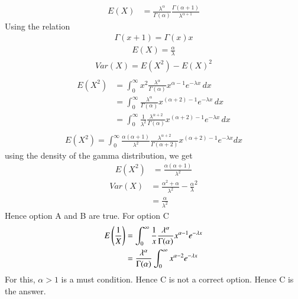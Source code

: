 \documentclass[journal,12pt,twocolumn]{IEEEtran}
\theoremstyle{remark}
\begin{document}
\begin{align}
E(X)&= \frac{\lambda^{\alpha}}{\Gamma(\alpha)}\frac{\Gamma(\alpha+1)}{\lambda^{\alpha+1}}
\end{align}
Using the relation
\begin{align}
\Gamma(x+1) = \Gamma(x) x
\end{align}
\begin{align}
E(X)=\frac{\alpha}{\lambda}
\end{align}
\begin{align}
{Var}(X) = {E}(X^2) - {E}(X)^2 \\
\end{align}
\begin{align}
{E}(X^2) &= \int_{0}^{\infty} x^2 \frac{{\lambda}^{\alpha}}{\Gamma({\alpha})} x^{{\alpha}-1} e^{-{\lambda}x} \, {d}x \\
&=\int_{0}^{\infty} \frac{{\lambda}^{\alpha}}{\Gamma({\alpha})} x^{({\alpha}+2)-1} e^{-{\lambda}x} \, {d}x \\
&=\int_{0}^{\infty} \frac{1}{{\lambda}^2} \frac{{\lambda}^{{\alpha}+2}}{\Gamma({\alpha})} x^{({\alpha}+2)-1} e^{-{\lambda}x} \, {d}x \\
\end{align}
\begin{align}
{E}(X^2) = \int_{0}^{\infty} \frac{{\alpha}({\alpha}+1)}{{\lambda}^2}  \frac{{\lambda}^{{\alpha}+2}}{\Gamma({\alpha}+2)} x^{({\alpha}+2)-1} e^{-{\lambda}x}{d}x
\end{align}
using the density of the gamma distribution, we get
\begin{align}
{E}(X^2) &= \frac{{\alpha}({\alpha}+1)}{{\lambda}^2} 
\end{align}
\begin{align}
{Var}(X) &= \frac{{\alpha}^2+{\alpha}}{{\lambda}^2} - {\frac{{\alpha}}{{\lambda}}} ^2 \\
&= \frac{{\alpha}}{{\lambda}^2}
\end{align}
Hence option A and B are true. For option C
\begin{align}
E\left(\frac{1}{X}\right)&= \int_{0}^{\infty} \frac{1}{x}\frac{\lambda^{\alpha}}{\Gamma(\alpha)}x^{\alpha - 1} e^{-\lambda x}\\
&= \frac{\lambda^{\alpha}}{\Gamma(\alpha)} \int_{0}^{\infty}x^{\alpha-2} e^{-\lambda x}
\end{align}
For this, $\alpha >1$ is a must condition. Hence C is not a correct option.
Hence C is the answer.
\end{document}
